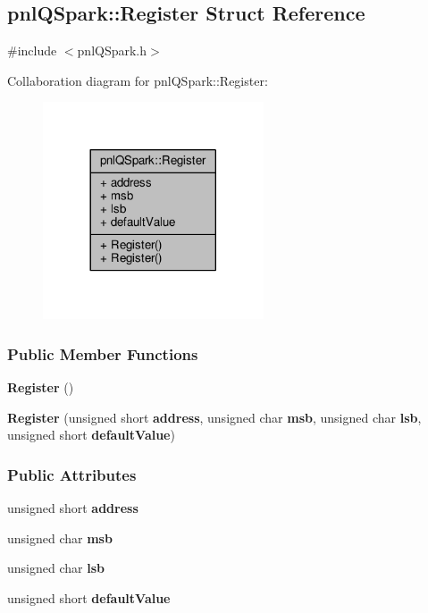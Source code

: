 \subsection{pnl\+Q\+Spark\+:\+:Register Struct Reference}
\label{structpnlQSpark_1_1Register}


{\ttfamily \#include $<$pnl\+Q\+Spark.\+h$>$}



Collaboration diagram for pnl\+Q\+Spark\+:\+:Register\+:
\nopagebreak
\begin{figure}[H]
\begin{center}
\leavevmode
\includegraphics[width=185pt]{d6/dbf/structpnlQSpark_1_1Register__coll__graph}
\end{center}
\end{figure}
\subsubsection*{Public Member Functions}
\begin{DoxyCompactItemize}
\item 
{\bf Register} ()
\item 
{\bf Register} (unsigned short {\bf address}, unsigned char {\bf msb}, unsigned char {\bf lsb}, unsigned short {\bf default\+Value})
\end{DoxyCompactItemize}
\subsubsection*{Public Attributes}
\begin{DoxyCompactItemize}
\item 
unsigned short {\bf address}
\item 
unsigned char {\bf msb}
\item 
unsigned char {\bf lsb}
\item 
unsigned short {\bf default\+Value}
\end{DoxyCompactItemize}


